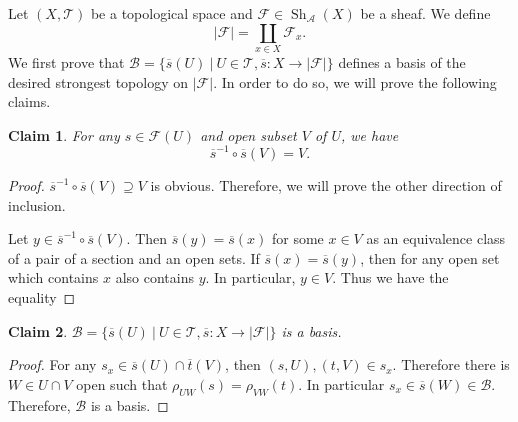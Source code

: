 \documentclass{article}
\newtheorem{claim}{Claim}
\DeclareMathOperator{\Sh}{Sh}
\begin{document}
Let $(X,\mathcal{T})$ be a topological space and $\mathcal{F}\in\Sh_{\mathcal{A}}(X)$ be a sheaf. We define
\begin{equation*}
\vert\mathcal{F}\vert = \coprod_{x\in X}\mathcal{F}_x.
\end{equation*}
We first prove that $\mathcal{B}=\{\overline{s}(U)\:|\: U\in\mathcal{T}, \overline{s}:X\to\vert\mathcal{F}\vert\}$ defines a basis of the desired strongest topology on $\vert\mathcal{F}\vert$.
In order to do so, we will prove the following claims.
\begin{claim}
For any $s\in\mathcal{F}(U)$ and open subset $V$ of $U$, we have
\begin{equation*}
\overline{s}^{-1}\circ\overline{s}(V)= V.
\end{equation*}
\label{claim_1}
\end{claim} 
\begin{proof}
 $\overline{s}^{-1}\circ\overline{s}(V)\supseteq V$ is obvious. Therefore, we will prove the other direction of inclusion.\\
\par Let $y\in\overline{s}^{-1}\circ\overline{s}(V)$. Then $\overline{s}(y)=\overline{s}(x)$ for some $x\in V$ as an equivalence class of a pair of a section and an open sets. If $\overline{s}(x) = \overline{s}(y)$, then for any open set which contains $x$ also contains $y$. In particular, $y\in V$. Thus we have the equality 
\end{proof}
\begin{claim}
$\mathcal{B}=\{\overline{s}(U)\:|\: U\in\mathcal{T}, \overline{s}:X\to\vert\mathcal{F}\vert\}$ is a basis.
\end{claim}
\begin{proof}
For any $s_x\in \overline{s}(U)\cap\overline{t}(V)$, then $(s,U),(t,V)\in s_x$. Therefore there is $W\in U\cap V$ open such that $\rho_{UW}(s)=\rho_{VW}(t)$. In particular $s_x\in\overline{s}(W)\in\mathcal{B}$. Therefore, $\mathcal{B}$ is a basis. 
\end{proof}
\end{document}
